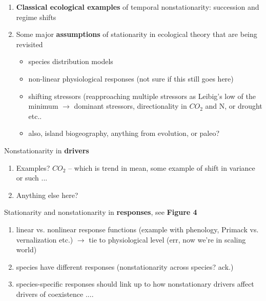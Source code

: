 \documentclass[11pt,a4paper,oneside]{article}
\begin{document}
\begin{enumerate}
\item {\bf Classical ecological examples} of temporal nonstationarity: succession and regime shifts
\item Some major {\bf assumptions} of stationarity in ecological theory that are being revisited
\begin{itemize}
\item species distribution models
\item non-linear physiological responses (not sure if this still goes here)
\item shifting stressors (reapproaching multiple stressors as Leibig's low of the minimum $\rightarrow$ dominant stressors, directionality in $CO_{2}$ and N, or drought etc..
\item also, island biogeography, anything from evolution, or paleo?
\end{itemize}
\end{enumerate}

Nonstationarity in {\bf drivers}
\begin{enumerate}
\item Examples? $CO_{2}$ -- which is trend in mean, some example of shift in variance or such ...
\item Anything else here?
\end{enumerate}

Stationarity and nonstationarity in {\bf responses}, see {\bf Figure 4}
\begin{enumerate}
\item linear vs. nonlinear response functions (example with phenology, Primack vs. vernalization etc.) $\rightarrow$ tie to physiological level (err, now we're in scaling world)
\item species have different responses (nonstationarity across species? ack.)
\item species-specific responses should link up to how nonstationary drivers affect drivers of coexistence .... 
\end{enumerate}
\end{document}
